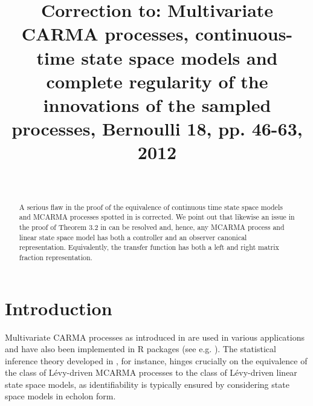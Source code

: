 \documentclass[preprint,a4paper,authoryear]{imsart}
\numberwithin{equation}{section}
\theoremstyle{plain}
\theoremstyle{definition}
\theoremstyle{remark}
\begin{document}
 
\begin{frontmatter}

\title{Correction to: Multivariate CARMA processes, continuous-time state space models and complete regularity of the innovations of the sampled processes, Bernoulli 18, pp. 46-63, 2012}%
\runtitle{}
\begin{aug}
	\author[A]{~}

	\address[A]{Institute of Mathematical Finance, Ulm University, Helmholtzstrasse 18, D-89081 Ulm, Germany}
	
\end{aug}


\begin{abstract}
A serious flaw in the proof of the equivalence of continuous time state space models and MCARMA processes spotted in \cite{FasenSchenk2024} is corrected. We point out that likewise an issue in the proof of Theorem 3.2 in \cite{brockwell2011parametric} can be resolved and, hence, any MCARMA process and linear state space model has both a controller and an observer canonical representation. Equivalently, the transfer function has both a left and right matrix fraction representation.
\end{abstract}

\begin{keyword}[class=AMS]
\end{keyword}

\begin{keyword}
\end{keyword}

\end{frontmatter}
\section{Introduction}
Multivariate CARMA processes as introduced in \cite{marquardt2007multivariate} are used in various applications and have also been implemented in R packages (see e.g. \cite{Tomasson2018}).
The statistical inference theory developed in \cite{FasenKimmig2020,FasenKimmig2017,FasenMayer2022,FasenScholz2019,SchlemmStelzer2012EJS}, for instance, hinges crucially on the equivalence of the class of L\'evy-driven MCARMA processes to the class  of L\'evy-driven linear state space models, as identifiability is typically ensured by considering state space models in echolon form.
\end{document}
